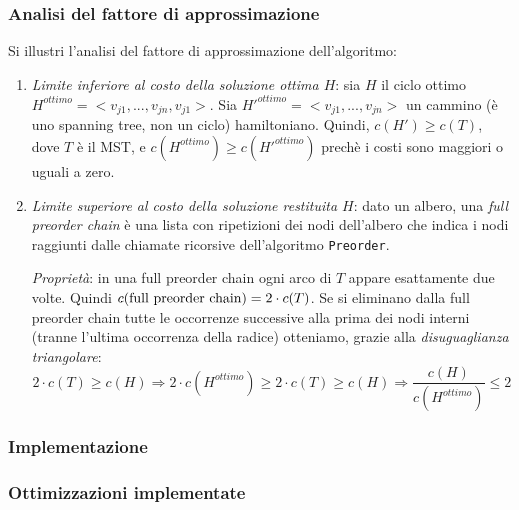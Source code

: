\subsubsection{Analisi del fattore di approssimazione}
Si illustri l'analisi del fattore di approssimazione dell'algoritmo:
\begin{enumerate}
    \item \textit{Limite inferiore al costo della soluzione ottima $H$}: sia $H$ il ciclo
    ottimo $H^{ottimo} = <v_{j1}, ..., v_{jn}, v_{j1}>$.
    Sia $H'^{ottimo} = <v_{j1}, ..., v_{jn}>$ un cammino
    (è uno spanning tree, non un ciclo) hamiltoniano. Quindi, $c(H') \ge c(T)$, dove $T$ è
    il MST, e $c(H^{ottimo}) \ge c(H'^{ottimo})$ prechè i costi sono maggiori o uguali a zero.

    \item \textit{Limite superiore al costo della soluzione restituita $H$}: dato un albero,
    una \textit{full preorder chain} è una lista con ripetizioni dei nodi dell'albero che
    indica i nodi raggiunti dalle chiamate ricorsive dell'algoritmo \verb|Preorder|.

    \textit{Proprietà}: in una full preorder chain ogni arco di $T$ appare esattamente due
    volte. Quindi $c(\textnormal{full preorder chain}) = 2 \cdot c(T)$. Se si eliminano
    dalla full preorder chain tutte le occorrenze successive alla prima dei nodi interni
    (tranne l'ultima occorrenza della radice) otteniamo, grazie alla
    \textit{disuguaglianza triangolare}:
    \[
        2 \cdot c(T) \ge c(H) \Rightarrow 2 \cdot c(H^{ottimo}) \ge 2 \cdot c(T) \ge c(H)
        \Rightarrow \frac{c(H)}{c(H^{ottimo})} \le 2
    \]

\end{enumerate}

\subsubsection{Implementazione}

\subsubsection{Ottimizzazioni implementate}

